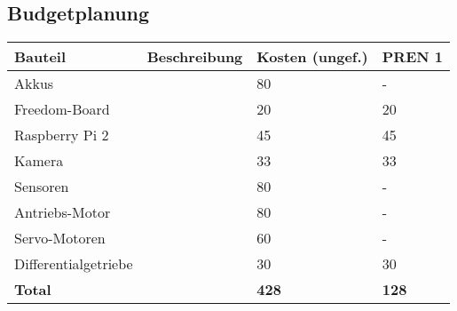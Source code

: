 \subsection{Budgetplanung}
\begin{table}[h]
\begin{tabular}{|p{} | p{}| p{}| p{}|}\hline
\textbf{Bauteil}	&	\textbf{Beschreibung}	& \textbf{Kosten (ungef.)} & \textbf{PREN 1} \\ \hline
Akkus & & 80 & - \\ \hline
Freedom-Board & & 20 & 20 \\ \hline
Raspberry Pi 2 & & 45 & 45 \\ \hline
Kamera & & 33 & 33 \\ \hline
Sensoren & & 80 & - \\ \hline
Antriebs-Motor & & 80 & - \\ \hline
Servo-Motoren & & 60 & - \\ \hline
Differentialgetriebe & & 30 & 30 \\ \hline
\textbf{Total} & & \textbf{428} & \textbf{128} \\ \hline
\end{tabular}
\end{table}
